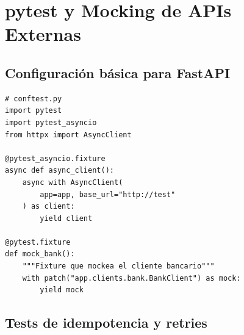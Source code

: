 \documentclass[11pt,a4paper]{article}
\begin{document}
\section{pytest y Mocking de APIs Externas}

\subsection{Configuración básica para FastAPI}

\begin{pybox}
\begin{lstlisting}[style=python]
# conftest.py
import pytest
import pytest_asyncio
from httpx import AsyncClient

@pytest_asyncio.fixture
async def async_client():
    async with AsyncClient(
        app=app, base_url="http://test"
    ) as client:
        yield client

@pytest.fixture
def mock_bank():
    """Fixture que mockea el cliente bancario"""
    with patch("app.clients.bank.BankClient") as mock:
        yield mock
\end{lstlisting}
\end{pybox}

\subsection{Tests de idempotencia y retries}
\end{document}
